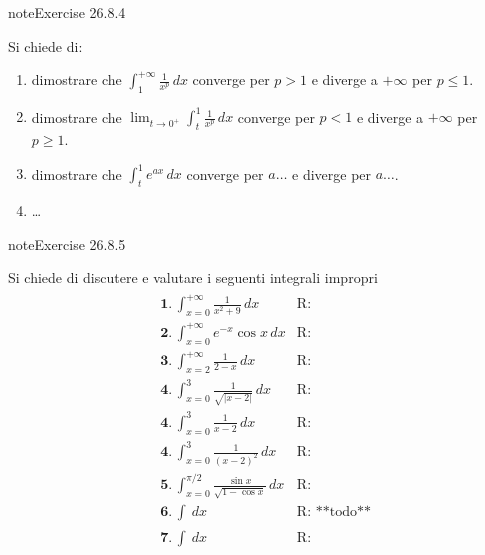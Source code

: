 \documentclass[letterpaper,10pt,italian]{jupyterBook}
\begin{document}
\begin{sphinxadmonition}{note}{Exercise 26.8.4}





\sphinxAtStartPar
Si chiede di:
\begin{enumerate}
%
\item {} 
\sphinxAtStartPar
dimostrare che \(\int_{1}^{+\infty} \frac{1}{x^p} \, dx\) converge per \(p > 1\) e diverge a \(+\infty\) per \(p \le 1\).

\item {} 
\sphinxAtStartPar
dimostrare che \(\lim_{t \rightarrow 0^+} \int_{t}^{1} \frac{1}{x^p} \, dx\) converge per \(p < 1\) e diverge a \(+\infty\) per \(p \ge 1\).

\item {} 
\sphinxAtStartPar
dimostrare che \(\int_{t}^{1} e^{a x} \, dx\) converge per \(a \dots\) e diverge per \(a \dots\).

\item {} 
\sphinxAtStartPar
…

\end{enumerate}
\end{sphinxadmonition}
 \label{exercise:ch/infinitesimal_calculus/integrals-problems-exercise-4}

\begin{sphinxadmonition}{note}{Exercise 26.8.5}



\sphinxAtStartPar
Si chiede di discutere e valutare i seguenti integrali impropri
\begin{equation*}
\begin{split}\begin{aligned}
 & \mathbf{1.} \,  \int_{x=0}^{+\infty} \frac{1}{x^2 + 9} \, dx & \text{R: } \\
 & \mathbf{2.} \,  \int_{x=0}^{+\infty} e^{-x} \cos x \, dx & \text{R: } \\
 & \mathbf{3.} \,  \int_{x=2}^{+\infty} \frac{1}{2-x} \, dx & \text{R: } \\
 & \mathbf{4.} \,  \int_{x=0}^{3} \frac{1}{\sqrt{|x-2|}}\, dx & \text{R: } \\
 & \mathbf{4.} \,  \int_{x=0}^{3} \frac{1}{x-2}\, dx & \text{R: } \\
 & \mathbf{4.} \,  \int_{x=0}^{3} \frac{1}{(x-2)^2}\, dx & \text{R: } \\
 & \mathbf{5.} \,  \int_{x=0}^{\pi/2} \frac{\sin x}{\sqrt{1-\cos x}} \, dx & \text{R: } \\
 & \mathbf{6.} \,  \int_{}^{} \, dx & \text{R: **todo**} \\
 & \mathbf{7.} \,  \int_{}^{} \, dx & \text{R: } \\
\end{aligned}\end{split}
\end{equation*}\end{sphinxadmonition}
\end{document}
